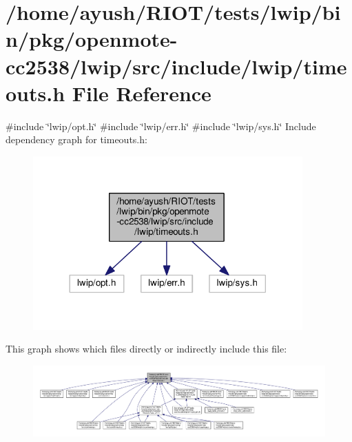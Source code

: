 \hypertarget{openmote-cc2538_2lwip_2src_2include_2lwip_2timeouts_8h}{}\section{/home/ayush/\+R\+I\+O\+T/tests/lwip/bin/pkg/openmote-\/cc2538/lwip/src/include/lwip/timeouts.h File Reference}
\label{openmote-cc2538_2lwip_2src_2include_2lwip_2timeouts_8h}
{\ttfamily \#include \char`\"{}lwip/opt.\+h\char`\"{}}\newline
{\ttfamily \#include \char`\"{}lwip/err.\+h\char`\"{}}\newline
{\ttfamily \#include \char`\"{}lwip/sys.\+h\char`\"{}}\newline
Include dependency graph for timeouts.\+h\+:
\nopagebreak
\begin{figure}[H]
\begin{center}
\leavevmode
\includegraphics[width=293pt]{openmote-cc2538_2lwip_2src_2include_2lwip_2timeouts_8h__incl}
\end{center}
\end{figure}
This graph shows which files directly or indirectly include this file\+:
\nopagebreak
\begin{figure}[H]
\begin{center}
\leavevmode
\includegraphics[width=350pt]{openmote-cc2538_2lwip_2src_2include_2lwip_2timeouts_8h__dep__incl}
\end{center}
\end{figure}

